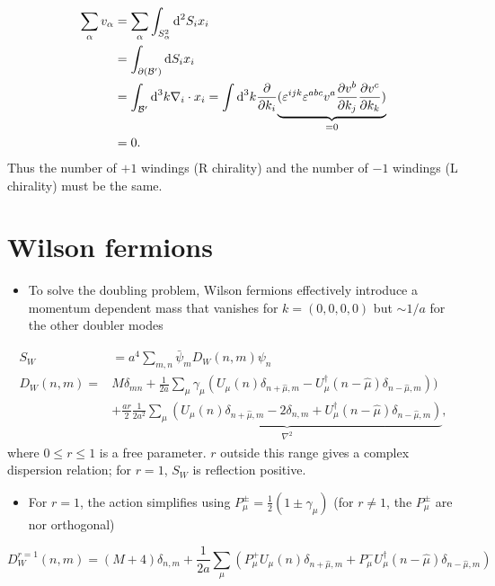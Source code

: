 \begin{align}
    \sum_\alpha v_\alpha &= \sum_\alpha \int_{S_\alpha^2}\text{d}^2S_i x_i \nonumber \\
    &= \int_{\partial({\cal B}^\prime)}\text{d}S_i x_i \nonumber \\
    &= \int_{{\cal B}^\prime}\text{d}^3 k \nabla_i \cdot x_i = \int \text{d}^3 k \frac{\partial}{\partial k_i}\underset{=0}{\underbrace{(\varepsilon^{ijk}\varepsilon^{abc}v^a \frac{\partial v^b}{\partial k_j}\frac{\partial v^c}{\partial k_k})}} \nonumber\\
    &= 0.
\end{align}
Thus the number of $+1$ windings (R chirality) and the number of $-1$ windings (L chirality) must be the same.
\section{ Wilson fermions }

\begin{itemize}
  \item To solve the doubling problem, Wilson fermions effectively introduce a momentum dependent mass that vanishes for \(k=(0,0,0,0)\) but \(\sim 1 / a\) for the other doubler modes
\end{itemize}

\begin{align}
    S_W &= a^4 \sum_{m,n}\bar{\psi}_m D_W(n,m)\psi_n \nonumber \\
    D_W(n,m) =& M \delta_{mn} + \frac{1}{2a}\sum_\mu \gamma_\mu (U_\mu(n) \delta_{n + \hat{\mu}, m} - U^\dagger_\mu(n - \hat{\mu}) \delta_{n - \hat{\mu}, m}))\nonumber \\
    &+ \frac{a r}{2} \underset{\nabla^2}{\underbrace{\frac{1}{2 a^2}\sum_\mu(U_\mu(n) \delta_{n + \hat{\mu}, m} - 2 \delta_{n,m} + U^\dagger_\mu(n - \hat{\mu})\delta_{n - \hat{\mu},  m})}},
\end{align}
where $0 \leq r \leq 1$ is a free parameter. $r$ outside this range gives a complex dispersion relation; for $r=1$, $S_W$ is reflection positive.

\begin{itemize}
    \item For $r=1$, the action simplifies using $P_\mu^{\pm} = \frac{1}{2}(1 \pm \gamma_\mu)$ (for $r \neq 1$, the $P^{\pm}_\mu$ are nor orthogonal)
\end{itemize}

\begin{equation}
D_{W}^{r=1}(n, m)=(M+4) \delta_{n, m}+\frac{1}{2 a} \sum_{\mu}\left(P_{\mu}^{+} U_{\mu}(n) \delta_{n+\hat{\mu}, m}+P_{\mu}^-U_{\mu}^{\dagger}(n-\hat{\mu}) \delta_{n-\hat{\mu}, m}\right)
\end{equation}

